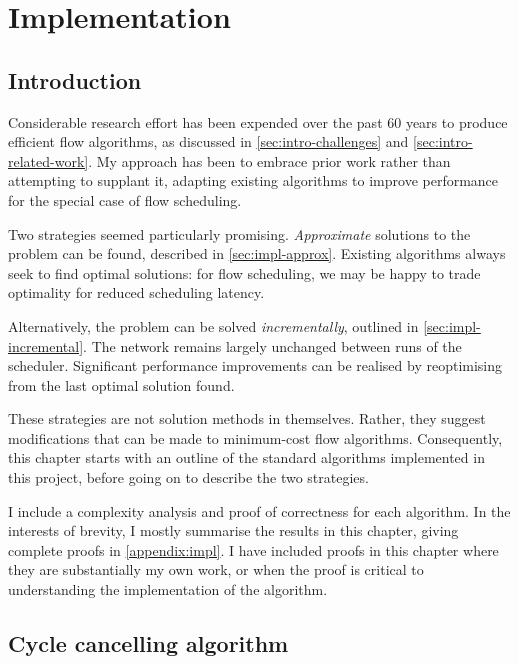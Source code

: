 \chapter{Implementation} \label{chap:impl}

\section{Introduction}


Considerable research effort has been expended over the past 60 years to produce efficient flow algorithms, as discussed in \cref{sec:intro-challenges} and \cref{sec:intro-related-work}. My approach has been to embrace prior work rather than attempting to supplant it, adapting existing algorithms to improve performance for the special case of flow scheduling.

Two strategies seemed particularly promising. \emph{Approximate} solutions to the problem can be found, described in \cref{sec:impl-approx}. Existing algorithms always seek to find optimal solutions: for flow scheduling, we may be happy to trade optimality for reduced scheduling latency. 

Alternatively, the problem can be solved \emph{incrementally}, outlined in \cref{sec:impl-incremental}. The network remains largely unchanged between runs of the scheduler. Significant performance improvements can be realised by reoptimising from the last optimal solution found.

These strategies are not solution methods in themselves. Rather, they suggest modifications that can be made to minimum-cost flow algorithms. Consequently, this chapter starts with an outline of the standard algorithms implemented in this project, before going on to describe the two strategies.

I include a complexity analysis and proof of correctness for each algorithm. In the interests of brevity, I mostly summarise the results in this chapter, giving complete proofs in \cref{appendix:impl}. I have included proofs in this chapter where they are substantially my own work, or when the proof is critical to understanding the implementation of the algorithm.

\section{Cycle cancelling algorithm} \label{sec:impl-cycle-cancelling}

